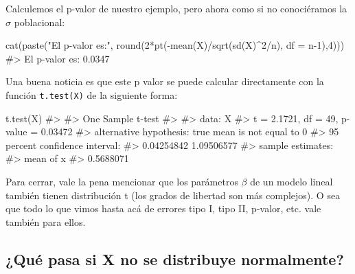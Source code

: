\documentclass[
  letterpaper,
  DIV=11,
  numbers=noendperiod,
  oneside]{scrreprt}
\newenvironment{Shaded}{\begin{snugshade}}{\end{snugshade}}
\newcommand{\AttributeTok}[1]{\textcolor[rgb]{0.40,0.45,0.13}{#1}}
\newcommand{\CommentTok}[1]{\textcolor[rgb]{0.37,0.37,0.37}{#1}}
\newcommand{\DecValTok}[1]{\textcolor[rgb]{0.68,0.00,0.00}{#1}}
\newcommand{\FunctionTok}[1]{\textcolor[rgb]{0.28,0.35,0.67}{#1}}
\newcommand{\NormalTok}[1]{\textcolor[rgb]{0.00,0.23,0.31}{#1}}
\newcommand{\SpecialCharTok}[1]{\textcolor[rgb]{0.37,0.37,0.37}{#1}}
\newcommand{\StringTok}[1]{\textcolor[rgb]{0.13,0.47,0.30}{#1}}
\begin{document}
Calculemos el p-valor de nuestro ejemplo, pero ahora como si no
conociéramos la \(\sigma\) poblacional:

\begin{Shaded}
\begin{Highlighting}[]
\FunctionTok{cat}\NormalTok{(}\FunctionTok{paste}\NormalTok{(}\StringTok{"El p{-}valor es:"}\NormalTok{, }\FunctionTok{round}\NormalTok{(}\DecValTok{2}\SpecialCharTok{*}\FunctionTok{pt}\NormalTok{(}\SpecialCharTok{{-}}\FunctionTok{mean}\NormalTok{(X)}\SpecialCharTok{/}\FunctionTok{sqrt}\NormalTok{(}\FunctionTok{sd}\NormalTok{(X)}\SpecialCharTok{\^{}}\DecValTok{2}\SpecialCharTok{/}\NormalTok{n), }\AttributeTok{df =}\NormalTok{ n}\DecValTok{{-}1}\NormalTok{),}\DecValTok{4}\NormalTok{)))}
\CommentTok{\#\textgreater{} El p{-}valor es: 0.0347}
\end{Highlighting}
\end{Shaded}

Una buena noticia es que este p valor se puede calcular directamente con
la función \texttt{t.test(X)} de la siguiente forma:

\begin{Shaded}
\begin{Highlighting}[]
\FunctionTok{t.test}\NormalTok{(X)}
\CommentTok{\#\textgreater{} }
\CommentTok{\#\textgreater{}  One Sample t{-}test}
\CommentTok{\#\textgreater{} }
\CommentTok{\#\textgreater{} data:  X}
\CommentTok{\#\textgreater{} t = 2.1721, df = 49, p{-}value = 0.03472}
\CommentTok{\#\textgreater{} alternative hypothesis: true mean is not equal to 0}
\CommentTok{\#\textgreater{} 95 percent confidence interval:}
\CommentTok{\#\textgreater{}  0.04254842 1.09506577}
\CommentTok{\#\textgreater{} sample estimates:}
\CommentTok{\#\textgreater{} mean of x }
\CommentTok{\#\textgreater{} 0.5688071}
\end{Highlighting}
\end{Shaded}

Para cerrar, vale la pena mencionar que los parámetros \(\beta\) de un
modelo lineal también tienen distribución t (los grados de libertad son
más complejos). O sea que todo lo que vimos hasta acá de errores tipo I,
tipo II, p-valor, etc. vale también para ellos.

\hypertarget{quuxe9-pasa-si-x-no-se-distribuye-normalmente}{%
\subsection{\texorpdfstring{¿Qué pasa si \textbf{X} no se distribuye
normalmente?}{¿Qué pasa si X no se distribuye normalmente?}}\label{quuxe9-pasa-si-x-no-se-distribuye-normalmente}}
\end{document}
